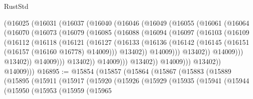 \begin{lexlean}{RustStd}
\begin{coremodule}
              (@16025
                (@16031
                  (@16037
                    (@16040
                      (@16046
                        (@16049
                          (@16055
                            (@16061
                              (@16064
                                (@16070
                                  (@16073
                                    (@16079
                                      (@16085
                                        (@16088
                                          (@16094
                                            (@16097
                                              (@16103
                                                (@16109
                                                  (@16112
                                                    (@16118
                                                      (@16121
                                                        (@16127
                                                          (@16133
                                                            (@16136
                                                              (@16142
                                                                (@16145
                                                                  (@16151
                                                                    (@16157
                                                                      (@16160 @16778)
                                                                      @14009)))
                                                                @13402))
                                                            @14009)))
                                                      @13402))
                                                  @14009)))
                                            @13402))
                                        @14009)))
                                  @13402))
                              @14009)))
                        @13402))
                    @14009)))
              @13402))
          @14009)))
@16895 := @15854
    (@15857
      (@15864
        (@15867
          (@15883
            (@15889
              (@15895
                (@15911
                  (@15917
                    (@15920
                      (@15926
                        (@15929
                          (@15935
                            (@15941
                              (@15944
                                (@15950
                                  (@15953
                                    (@15959
                                      (@15965

\end{coremodule}
\end{lexlean}
